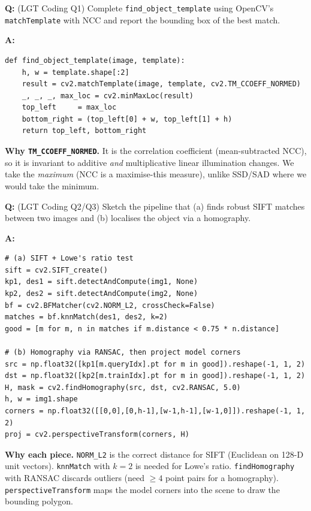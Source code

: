 \begin{exbox}
\textbf{Q:} (LGT Coding Q1) Complete \texttt{find\_object\_template} using OpenCV's \texttt{matchTemplate} with NCC and report the bounding box of the best match.

\textbf{A:}
\begin{verbatim}
def find_object_template(image, template):
    h, w = template.shape[:2]
    result = cv2.matchTemplate(image, template, cv2.TM_CCOEFF_NORMED)
    _, _, _, max_loc = cv2.minMaxLoc(result)
    top_left     = max_loc
    bottom_right = (top_left[0] + w, top_left[1] + h)
    return top_left, bottom_right
\end{verbatim}
\textbf{Why \texttt{TM\_CCOEFF\_NORMED}.} It is the correlation coefficient (mean-subtracted NCC), so it is invariant to additive \emph{and} multiplicative linear illumination changes. We take the \emph{maximum} (NCC is a maximise-this measure), unlike SSD/SAD where we would take the minimum.
\end{exbox}

\begin{exbox}
\textbf{Q:} (LGT Coding Q2/Q3) Sketch the pipeline that (a) finds robust SIFT matches between two images and (b) localises the object via a homography.

\textbf{A:}
\begin{verbatim}
# (a) SIFT + Lowe's ratio test
sift = cv2.SIFT_create()
kp1, des1 = sift.detectAndCompute(img1, None)
kp2, des2 = sift.detectAndCompute(img2, None)
bf = cv2.BFMatcher(cv2.NORM_L2, crossCheck=False)
matches = bf.knnMatch(des1, des2, k=2)
good = [m for m, n in matches if m.distance < 0.75 * n.distance]

# (b) Homography via RANSAC, then project model corners
src = np.float32([kp1[m.queryIdx].pt for m in good]).reshape(-1, 1, 2)
dst = np.float32([kp2[m.trainIdx].pt for m in good]).reshape(-1, 1, 2)
H, mask = cv2.findHomography(src, dst, cv2.RANSAC, 5.0)
h, w = img1.shape
corners = np.float32([[0,0],[0,h-1],[w-1,h-1],[w-1,0]]).reshape(-1, 1, 2)
proj = cv2.perspectiveTransform(corners, H)
\end{verbatim}
\textbf{Why each piece.} \texttt{NORM\_L2} is the correct distance for SIFT (Euclidean on 128-D unit vectors). \texttt{knnMatch} with $k=2$ is needed for Lowe's ratio. \texttt{findHomography} with RANSAC discards outliers (need $\geq 4$ point pairs for a homography). \texttt{perspectiveTransform} maps the model corners into the scene to draw the bounding polygon.
\end{exbox}

